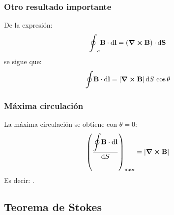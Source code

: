 \documentclass[12pt]{beamer}
\begin{document}
\begin{frame}
\frametitle{Otro resultado importante}
De la expresión:
\pause
\begin{align*}
\scaleoint{6ex}_{c} \vb{B} \cdot \dd{\vb{l}} = (\curl{\vb{B}}) \cdot \dd{\vb{S}}
\end{align*}
\pause
se sigue que:
\pause
\begin{align*}
\scaleoint{6ex} \vb{B} \cdot \dd{\vb{l}} = \abs{\curl{\vb{B}}} \dd{S \, \cos \theta}
\end{align*}
\end{frame}
\begin{frame}
\frametitle{Máxima circulación}
La máxima circulación se obtiene con $\theta = 0$:
\pause
\begin{align*}
\left( \dfrac{\displaystyle \scaleoint{6ex} \vb{B} \cdot \dd{\vb{l}}}{\dd{S}} \right)_{\max} = \abs{\curl{\vb{B}}}
\end{align*}
Es decir: .
\end{frame}

\subsection{Teorema de Stokes}
\end{document}
